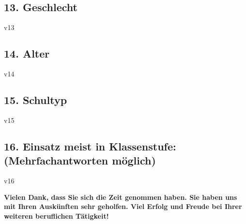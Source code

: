 \documentclass[a4paper,10pt]{article}
\begin{document}
{\subsection*{13. Geschlecht}
\vspace{0.5cm}
\begin{questionmult}{v13}
	\begin{choiceshoriz}
	\end{choiceshoriz}
\end{questionmult}

\subsection*{14. Alter}
\vspace{0.5cm}
\begin{questionmult}{v14}
	\begin{choices}
	\end{choices}
\end{questionmult}

\subsection*{15. Schultyp}
\vspace{0.5cm}
\begin{questionmult}{v15}
	\begin{choices}
		\scoring{b=1}
		\scoring{b=2}
		\scoring{b=3}
		\scoring{b=4}
		\scoring{b=5}
		\scoring{b=6}
	\end{choices}
\end{questionmult}

\subsection*{16. Einsatz meist in Klassenstufe: \\ (Mehrfachantworten möglich)}
\vspace{0.5cm}
\begin{questionmult}{v16}
	\begin{choices}
	\end{choices}
\end{questionmult}


\bigskip

\begin{flushleft}
\textbf{Vielen Dank, dass Sie sich die Zeit genommen haben. Sie haben uns mit Ihren Auskünften sehr geholfen. Viel Erfolg und Freude bei Ihrer weiteren beruflichen Tätigkeit!}
\end{flushleft}


}
\end{document}
